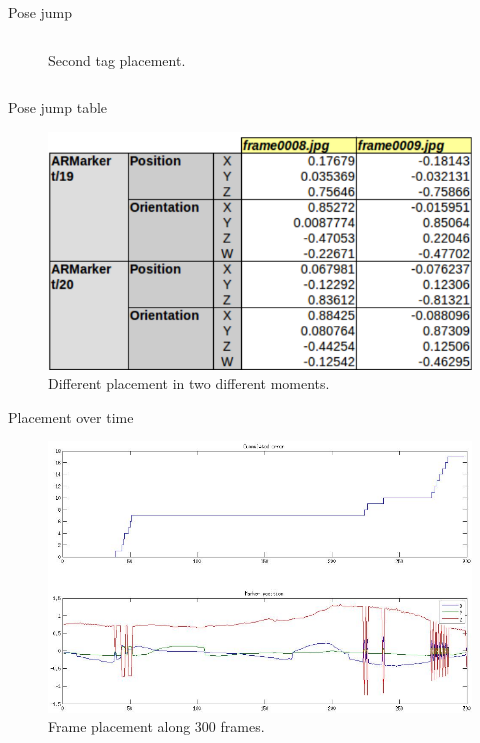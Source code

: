 \documentclass[10pt]{beamer}
\begin{document}
\begin{frame}[fragile]{Pose jump}
\begin{columns}
\begin{figure}
        \caption{Second tag placement.}
      \end{figure}
  \end{columns}

\end{frame}


\begin{frame}[fragile]{Pose jump table}

  \begin{figure}
    \includegraphics[scale=0.4]{pj_table}
    \caption{Different placement in two different moments.}
  \end{figure}

\end{frame}


\begin{frame}[fragile]{Placement over time}

\vspace{0.5 cm}
  \begin{figure}
    \centering
    \includegraphics[scale=0.35]{300frames01}
    \caption{Frame placement along 300 frames.}
  \end{figure}

\end{frame}
\end{document}
